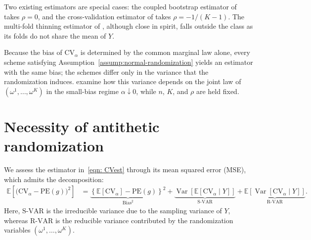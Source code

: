 \documentclass[12pt]{article}
\DeclareMathOperator{\Var}{Var}
\theoremstyle{general}
\newcommand{\cv}{{\mathrm{CV}}}
\begin{document}
Two existing estimators are special cases: the coupled bootstrap estimator of \citet{oliveira2024unbiased} takes $\rho=0$, and the cross-validation estimator of \citet{liu2024cross} takes $\rho=-1/(K-1)$.
The multi-fold thinning estimator of \citet{neufeld2024data}, although close in spirit, falls outside the class as its folds do not share the mean of $Y$.

Because the bias of $\cv_\alpha$ is determined by the common marginal law alone, every scheme satisfying Assumption~\ref{assump:normal-randomization} yields an estimator with the same bias; the schemes differ only in the variance that the randomization induces.  examine how this variance depends on the joint law of $(\omega^1,\ldots,\omega^K)$ in the small-bias regime $\alpha\downarrow0$, while $n$, $K$, and $\rho$ are held fixed.

\section{Necessity of antithetic randomization}
\label{sec: zero-sum}

We assess the estimator in~\eqref{eqn: CVest} through its mean squared error (MSE), which admits the decomposition:
\begin{align*}
\mathbb{E} \left[ \big(\cv_{\alpha} - \text{PE}(g) \big)^2 \right]
&= \underbrace{\left\{ \mathbb{E} [\cv_{\alpha}] - \text{PE}(g) \right\}^2}_{\text{Bias$^2$}} +  \underbrace{\Var \left[ \mathbb{E} [\cv_{\alpha} \mid Y] \right]}_{\text{S-VAR}} + \underbrace{\mathbb{E} \left[ \Var [\cv_{\alpha} \mid Y] \right]}_{\text{R-VAR}}.
\end{align*}
Here, $\mathrm{S\text{-}VAR}$ is the irreducible variance due to the sampling variance of $Y$, whereas $\mathrm{R\text{-}VAR}$ is the reducible variance contributed by the randomization variables $(\omega^1,\ldots,\omega^K)$.
\end{document}
